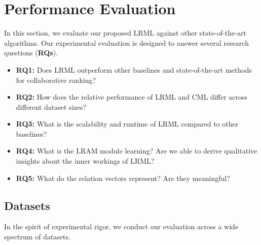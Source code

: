 \documentclass[sigconf]{acmart}
\begin{document}
\section{Performance Evaluation}
In this section, we evaluate our proposed \textsc{LRML} against other state-of-the-art algorithms. Our experimental evaluation is designed to answer several research questions (\textbf{RQs}).
\begin{itemize}
\item \textbf{RQ1:} Does LRML outperform other baselines and state-of-the-art methods for collaborative ranking? 
\item \textbf{RQ2:} How does the relative performance of LRML and CML differ across different dataset sizes?
\item \textbf{RQ3:} What is the scalability and runtime of LRML compared to other baselines?
\item \textbf{RQ4:} What is the LRAM module learning? Are we able to derive qualitative insights about the inner workings of LRML?
\item \textbf{RQ5:} What do the relation vectors represent? Are they meaningful?
\end{itemize}
\subsection{Datasets}



In the spirit of experimental rigor, we conduct our evaluation across a wide spectrum of datasets. 
\end{document}
